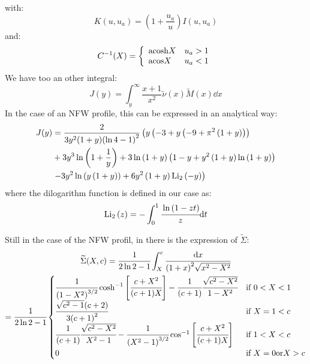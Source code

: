 %
with:
%
\begin{equation}
    K(u,u_a)=\left({1+\frac{u_a}{u}}\right){I(u,u_a)}
\end{equation}
%
and:
%
\begin{equation}
    C^{-1}(X)=\left\{\begin{array}{lr}
        {\rm{acosh}}{X}&u_a>1\\
        {\rm{acos}}{X}&u_a<1\\
    \end{array}\right.
\end{equation}
%
We have too an other integral:
%
\begin{equation}
    J(y)=\int_y^{\infty}\frac{x+1}{x^2}\widetilde{\nu}{(x)}\widetilde{M}{(x)}\dd{x}
\end{equation}
%
In the case of an NFW profile, this can be expressed in an analytical way:
%
\begin{align*}
    J(y)&=
        \frac{2}{3{y^2}(1+y){\left(\ln{4}-1\right)}^2}
        \left(y\left(-3+y\left(-9+\pi^2\left(1+y\right)\right)\right)\right.\\
    &+3{y^3}\ln\left(1+\frac{1}{y}\right)+3\ln\left(1+y\right)
            \left(1-y+y^2\left(1+y\right)\ln\left(1+y\right)\right)\\
    &\left.-3{y^2}\ln\left({y}\left(1+y\right)\right)+6{y^2}
        \left(1+y\right){\mathrm{Li}_2\left(-y\right)}\right)\\
\end{align*}
%
where the dilogarithm function is defined in our case as:
%
\begin{equation}
    \mathrm{Li}_2\left(z\right)=-\int_0^1\cfrac{\ln{(1-zt)}}{z}{\rm{d}}{t}
\end{equation}

Still in the case of the NFW profil, in \citet{MBM+10} there is the expression
of $\widetilde{\Sigma}$:
%
\begin{multline}
    \widetilde{\Sigma}(X,c)=\cfrac{1}{2\ln2-1}\int_X^c\cfrac{{\rm{d}}{x}}{{(1+x)}^2\sqrt{x^2-X^2}}\\
    =\cfrac{1}{2\ln2-1}\begin{cases}
        \cfrac{1}{{(1-X^2)}^{3/2}}
        \cosh^{-1}\left[\cfrac{c+X^2}{(c+1)X}\right]-
        \cfrac{1}{(c+1)}\cfrac{\sqrt{c^2-X^2}}{1-X^2} &\text{if } 0<X<1 \\
    \cfrac{\sqrt{c^2-1}(c+2)}{3{(c+1)}^2} &\text{if } X=1<c\\
    \cfrac{1}{(c+1)}\cfrac{\sqrt{c^2-X^2}}{X^2-1}-
    \cfrac{1}{{(X^2-1)}^{3/2}}
    \cos^{-1}\left[\cfrac{c+X^2}{(c+1)X}\right] &\text{if } 1<X<c\\
    0 &\text{if } X=0\text{or}X>c
    \end{cases}
\end{multline}

